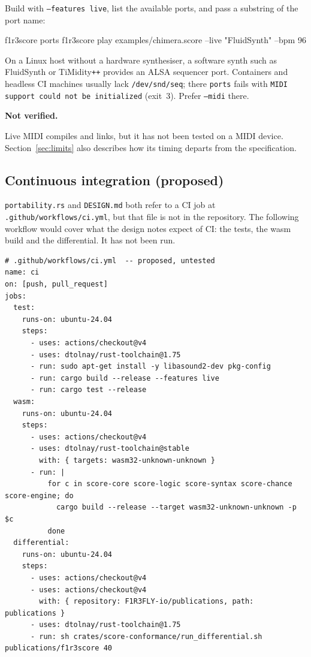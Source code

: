 \documentclass[11pt,a4paper]{article}
\newcommand{\ttx}[1]{\texttt{#1}}
\newenvironment{caveat}[1]{\par\medskip\noindent\colorbox{notebg}{\parbox{\dimexpr\linewidth-2\fboxsep}{\small\textbf{#1.}\ }}\par\nopagebreak\begingroup\small}{\endgroup\par\medskip}
\begin{document}
Build with \ttx{--features live}, list the available ports, and pass a
substring of the port name:

\begin{shell}
f1r3score ports
f1r3score play examples/chimera.score --live "FluidSynth" --bpm 96
\end{shell}

\noindent On a Linux host without a hardware synthesiser, a software synth
such as FluidSynth or TiMidity\texttt{++} provides an ALSA sequencer port.
Containers and headless CI machines usually lack \ttx{/dev/snd/seq}; there
\ttx{ports} fails with
\ttx{MIDI support could not be initialized} (exit~3). Prefer \ttx{--midi} there.

\begin{caveat}{Not verified}
Live MIDI compiles and links, but it has not been tested on a MIDI device.
Section~\ref{sec:limits} also describes how its timing departs from the
specification.
\end{caveat}

\subsection{Continuous integration (proposed)}

\ttx{portability.rs} and \ttx{DESIGN.md} both refer to a CI job at
\ttx{.github/workflows/ci.yml}, but that file is not in the repository. The
following workflow would cover what the design notes expect of CI: the tests,
the wasm build and the differential. It has not been run.

\begin{lstlisting}[language={}]
# .github/workflows/ci.yml  -- proposed, untested
name: ci
on: [push, pull_request]
jobs:
  test:
    runs-on: ubuntu-24.04
    steps:
      - uses: actions/checkout@v4
      - uses: dtolnay/rust-toolchain@1.75
      - run: sudo apt-get install -y libasound2-dev pkg-config
      - run: cargo build --release --features live
      - run: cargo test --release
  wasm:
    runs-on: ubuntu-24.04
    steps:
      - uses: actions/checkout@v4
      - uses: dtolnay/rust-toolchain@stable
        with: { targets: wasm32-unknown-unknown }
      - run: |
          for c in score-core score-logic score-syntax score-chance score-engine; do
            cargo build --release --target wasm32-unknown-unknown -p $c
          done
  differential:
    runs-on: ubuntu-24.04
    steps:
      - uses: actions/checkout@v4
      - uses: actions/checkout@v4
        with: { repository: F1R3FLY-io/publications, path: publications }
      - uses: dtolnay/rust-toolchain@1.75
      - run: sh crates/score-conformance/run_differential.sh publications/f1r3score 40
\end{lstlisting}
\end{document}
